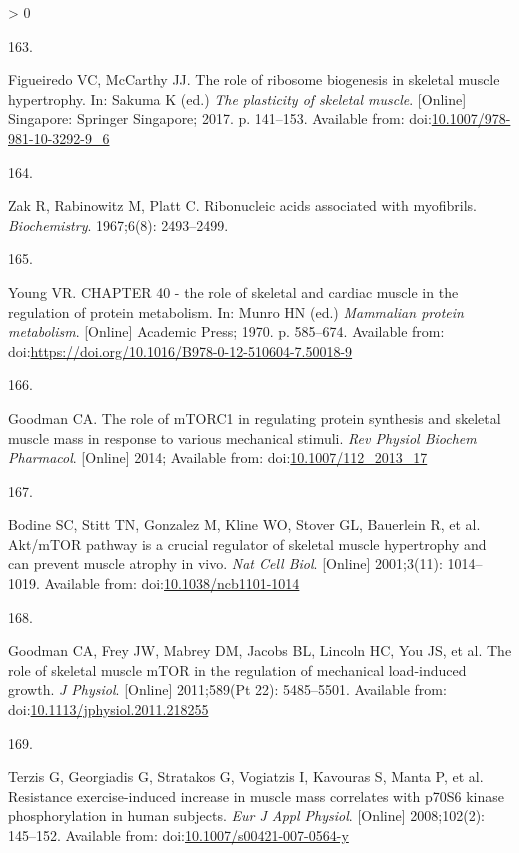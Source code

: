 \documentclass[twoside,10pt]{gihclass} %
\newlength{\cslhangindent}
\newlength{\csllabelwidth}
\newenvironment{CSLReferences}[3] %
 {%
  \setlength{\parindent}{0pt}
  \ifodd #1 \everypar{\setlength{\hangindent}{\cslhangindent}}\ignorespaces\fi
  \ifnum #2 > 0
  \setlength{\parskip}{#2\baselineskip}
  \fi
 }%
 {}
\newcommand{\CSLLeftMargin}[1]{\parbox[t]{\maxof{\widthof{#1}}{\csllabelwidth}}{#1}}
\newcommand{\CSLRightInline}[1]{\parbox[t]{\linewidth}{#1}}
\begin{document}
\begin{CSLReferences}{0}{0}
\leavevmode\hypertarget{ref-RN1912}{}%
\CSLLeftMargin{163. }
\CSLRightInline{Figueiredo VC, McCarthy JJ. The role of ribosome biogenesis in skeletal muscle hypertrophy. In: Sakuma K (ed.) \emph{The plasticity of skeletal muscle}. {[}Online{]} Singapore: Springer Singapore; 2017. p. 141--153. Available from: doi:\href{https://doi.org/10.1007/978-981-10-3292-9_6}{10.1007/978-981-10-3292-9\_6}}

\leavevmode\hypertarget{ref-RN2054}{}%
\CSLLeftMargin{164. }
\CSLRightInline{Zak R, Rabinowitz M, Platt C. Ribonucleic acids associated with myofibrils. \emph{Biochemistry}. 1967;6(8): 2493--2499. }

\leavevmode\hypertarget{ref-RN2223}{}%
\CSLLeftMargin{165. }
\CSLRightInline{Young VR. CHAPTER 40 - the role of skeletal and cardiac muscle in the regulation of protein metabolism. In: Munro HN (ed.) \emph{Mammalian protein metabolism}. {[}Online{]} Academic Press; 1970. p. 585--674. Available from: doi:\url{https://doi.org/10.1016/B978-0-12-510604-7.50018-9}}

\leavevmode\hypertarget{ref-RN1049}{}%
\CSLLeftMargin{166. }
\CSLRightInline{Goodman CA. The role of mTORC1 in regulating protein synthesis and skeletal muscle mass in response to various mechanical stimuli. \emph{Rev Physiol Biochem Pharmacol}. {[}Online{]} 2014; Available from: doi:\href{https://doi.org/10.1007/112_2013_17}{10.1007/112\_2013\_17}}

\leavevmode\hypertarget{ref-RN782}{}%
\CSLLeftMargin{167. }
\CSLRightInline{Bodine SC, Stitt TN, Gonzalez M, Kline WO, Stover GL, Bauerlein R, et al. Akt/mTOR pathway is a crucial regulator of skeletal muscle hypertrophy and can prevent muscle atrophy in vivo. \emph{Nat Cell Biol}. {[}Online{]} 2001;3(11): 1014--1019. Available from: doi:\href{https://doi.org/10.1038/ncb1101-1014}{10.1038/ncb1101-1014}}

\leavevmode\hypertarget{ref-RN1072}{}%
\CSLLeftMargin{168. }
\CSLRightInline{Goodman CA, Frey JW, Mabrey DM, Jacobs BL, Lincoln HC, You JS, et al. The role of skeletal muscle mTOR in the regulation of mechanical load-induced growth. \emph{J Physiol}. {[}Online{]} 2011;589(Pt 22): 5485--5501. Available from: doi:\href{https://doi.org/10.1113/jphysiol.2011.218255}{10.1113/jphysiol.2011.218255}}

\leavevmode\hypertarget{ref-RN785}{}%
\CSLLeftMargin{169. }
\CSLRightInline{Terzis G, Georgiadis G, Stratakos G, Vogiatzis I, Kavouras S, Manta P, et al. Resistance exercise-induced increase in muscle mass correlates with p70S6 kinase phosphorylation in human subjects. \emph{Eur J Appl Physiol}. {[}Online{]} 2008;102(2): 145--152. Available from: doi:\href{https://doi.org/10.1007/s00421-007-0564-y}{10.1007/s00421-007-0564-y}}


\end{CSLReferences}
\end{document}
